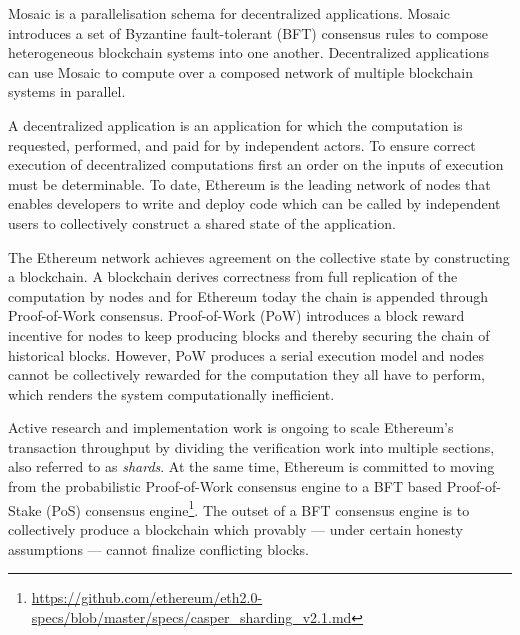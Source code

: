 \documentclass[12pt,a4paper]{article}
\begin{document}
Mosaic is a parallelisation schema for decentralized applications.
Mosaic introduces a set of Byzantine fault-tolerant (BFT) consensus rules to compose heterogeneous blockchain systems into one another.
Decentralized applications can use Mosaic to compute over a composed network of multiple blockchain systems in parallel.

A decentralized application is an application for which the computation is requested, performed, and paid for by independent actors.
To ensure correct execution of decentralized computations first an order on the inputs of execution must be determinable.
To date, Ethereum is the leading network
of nodes that enables developers to write and deploy code which can be called by independent users to collectively construct a shared state of the application.

The Ethereum network achieves agreement on the collective state by constructing a blockchain.
A blockchain derives correctness from full replication of the computation by nodes and for Ethereum today the chain is appended through Proof-of-Work consensus.
Proof-of-Work (PoW) introduces a block reward incentive for nodes to keep producing blocks and thereby securing the chain of historical blocks.
However, PoW produces a serial execution model and nodes cannot be collectively rewarded for the computation they all have to perform, which renders the system computationally inefficient\cite{verifiersdilemma}.

Active research and implementation work is ongoing to scale Ethereum's transaction throughput by dividing the verification work into multiple sections, also referred to as \emph{shards}.
At the same time, Ethereum is committed to moving from the probabilistic Proof-of-Work consensus engine to a BFT based Proof-of-Stake (PoS) consensus engine\footnote{
	\url{https://github.com/ethereum/eth2.0-specs/blob/master/specs/casper_sharding_v2.1.md}
}.
The outset of a BFT consensus engine is to collectively produce a blockchain which provably --- under certain honesty assumptions --- cannot finalize conflicting blocks.

\end{document}
